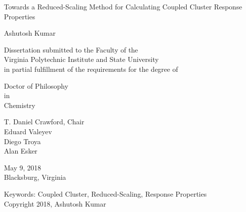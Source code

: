 \documentclass[12pt]{report}
\begin{document}
\thispagestyle{empty}
\begin{center}

{\Large 
Towards a Reduced-Scaling Method for Calculating Coupled Cluster Response Properties
}

\vfill

Ashutosh Kumar

\vfill

Dissertation submitted to the Faculty of the \\
Virginia Polytechnic Institute and State University \\
in partial fulfillment of the requirements for the degree of

\vfill

Doctor of Philosophy \\
in \\
Chemistry

\vfill

T. Daniel Crawford, Chair \\
Eduard Valeyev \\
Diego Troya \\
Alan Esker

\vfill

May 9, 2018 \\
Blacksburg, Virginia

\vfill

Keywords: Coupled Cluster, Reduced-Scaling, Response Properties
\\
Copyright 2018, Ashutosh Kumar

\end{center}

\pagebreak
\end{document}

